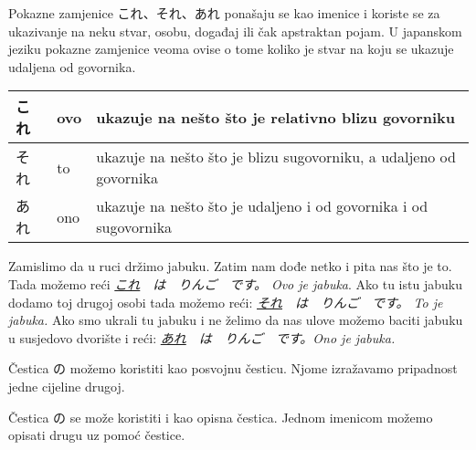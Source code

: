 	

	Pokazne zamjenice これ、それ、あれ ponašaju se kao imenice i koriste se za ukazivanje na neku stvar, osobu, događaj ili čak apstraktan pojam. U japanskom jeziku pokazne zamjenice veoma ovise o tome koliko je stvar na koju se ukazuje udaljena od govornika.
	
	\vspace{10pt}
	\begin{tabular}{|l|l|l|}
		\hline
		これ&ovo&ukazuje na nešto što je relativno blizu govorniku\\\hline
		それ&to&ukazuje na nešto što je blizu sugovorniku, a udaljeno od govornika\\\hline
		あれ&ono&ukazuje na nešto što je udaljeno i od govornika i od sugovornika\\\hline
	\end{tabular}
	\vspace{10pt}
	
	Zamislimo da u ruci držimo jabuku. Zatim nam dođe netko i pita nas što je to. Tada možemo reći \textit{\underline{これ}　は　りんご　です。 Ovo je jabuka}.\newline 
	Ako tu istu jabuku dodamo toj drugoj osobi tada možemo reći: \textit{ \underline{それ}　は　りんご　です。 To je jabuka.} \newline
	Ako smo ukrali tu jabuku i ne želimo da nas ulove možemo baciti jabuku u susjedovo dvorište i reći: \textit{\underline{あれ}　は　りんご　です。Ono je jabuka.}\newline
	
	\newpage
	
	
	Čestica の možemo koristiti kao posvojnu česticu. Njome izražavamo pripadnost jedne cijeline drugoj.

	
	
	\begin{reibun}
	\end{reibun}
	
	
	
	Čestica の se može koristiti i kao opisna čestica. Jednom imenicom možemo opisati drugu uz pomoć čestice.

	
